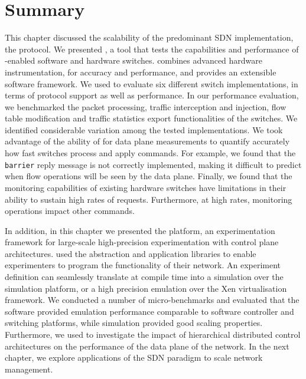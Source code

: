 \section{Summary} \label{sec:modeling:summary}

This chapter discussed the scalability of the predominant SDN
implementation, the \of protocol.  We presented \oflops, a tool that tests the
capabilities and performance of \of-enabled software and hardware switches.
\oflops combines advanced hardware instrumentation, for accuracy and
performance, and provides an extensible software framework. We used \oflops to
evaluate six different \of switch implementations, in terms of \of
protocol support as well as performance.  In our performance evaluation, we
benchmarked the packet processing, traffic interception and injection, flow table
modification and traffic statistics export functionalities of the switches.  We
identified considerable variation among the tested \of implementations.  We took
advantage of the ability of \oflops for data plane measurements to quantify
accurately how fast switches process and apply \of commands.  For example, we
found that the \texttt{barrier} reply message is not correctly implemented,
making it difficult to predict when flow operations will be seen by the data
plane.  Finally, we found that the monitoring capabilities of existing hardware
switches have limitations in their ability to sustain high rates of requests.
Furthermore, at high rates, monitoring operations impact other \of commands.

In addition, in this chapter we presented the \sdnsim platform, an experimentation
framework for large-scale high-precision experimentation with control plane
architectures. \sdnsim used the \mirage abstraction and application libraries to enable
experimenters to program the functionality of their network. An \sdnsim experiment
definition can seamlessly translate at compile time into a simulation over the 
simulation platform, or a high precision emulation over the Xen virtualisation
framework. We conducted a number of micro-benchmarks and evaluated that the
software provided emulation performance comparable to software \of controller and
switching platforms, while \sdnsim simulation provided good scaling properties.
Furthermore, we used \sdnsim to investigate the impact of hierarchical distributed
control architectures on the performance of the data plane of the network.  In
the next chapter, we explore applications of the SDN paradigm to scale network
management. 

